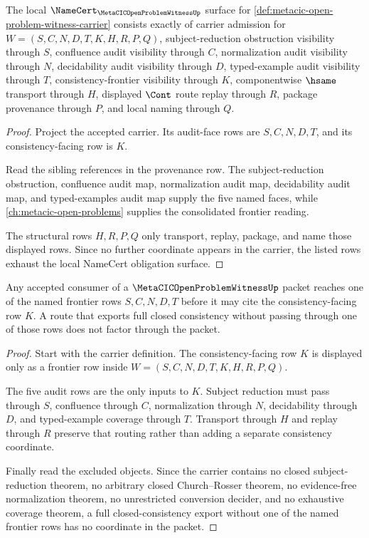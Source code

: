 \begin{theorem}
\label{thm:metacic-open-problem-witness-namecert-obligations}
The local $\NameCert_{\MetaCICOpenProblemWitnessUp}$ surface for \autoref{def:metacic-open-problem-witness-carrier} consists exactly of carrier admission for $W=(S,C,N,D,T,K,H,R,P,Q)$, subject-reduction obstruction visibility through $S$, confluence audit visibility through $C$, normalization audit visibility through $N$, decidability audit visibility through $D$, typed-example audit visibility through $T$, consistency-frontier visibility through $K$, componentwise $\hsame$ transport through $H$, displayed $\Cont$ route replay through $R$, package provenance through $P$, and local naming through $Q$.
\end{theorem}
\begin{proof}
Project the accepted carrier. Its audit-face rows are $S,C,N,D,T$, and its consistency-facing row is $K$.

Read the sibling references in the provenance row. The subject-reduction obstruction, confluence audit map, normalization audit map, decidability audit map, and typed-examples audit map supply the five named faces, while \autoref{ch:metacic-open-problems} supplies the consolidated frontier reading.

The structural rows $H,R,P,Q$ only transport, replay, package, and name those displayed rows. Since no further coordinate appears in the carrier, the listed rows exhaust the local NameCert obligation surface.
\end{proof}

\begin{theorem}
\label{thm:metacic-open-problem-witness-frontier-nonescape}
Any accepted consumer of a $\MetaCICOpenProblemWitnessUp$ packet reaches one of the named frontier rows $S,C,N,D,T$ before it may cite the consistency-facing row $K$. A route that exports full closed consistency without passing through one of those rows does not factor through the packet.
\end{theorem}
\begin{proof}
Start with the carrier definition. The consistency-facing row $K$ is displayed only as a frontier row inside $W=(S,C,N,D,T,K,H,R,P,Q)$.

The five audit rows are the only inputs to $K$. Subject reduction must pass through $S$, confluence through $C$, normalization through $N$, decidability through $D$, and typed-example coverage through $T$. Transport through $H$ and replay through $R$ preserve that routing rather than adding a separate consistency coordinate.

Finally read the excluded objects. Since the carrier contains no closed subject-reduction theorem, no arbitrary closed Church--Rosser theorem, no evidence-free normalization theorem, no unrestricted conversion decider, and no exhaustive coverage theorem, a full closed-consistency export without one of the named frontier rows has no coordinate in the packet.
\end{proof}


